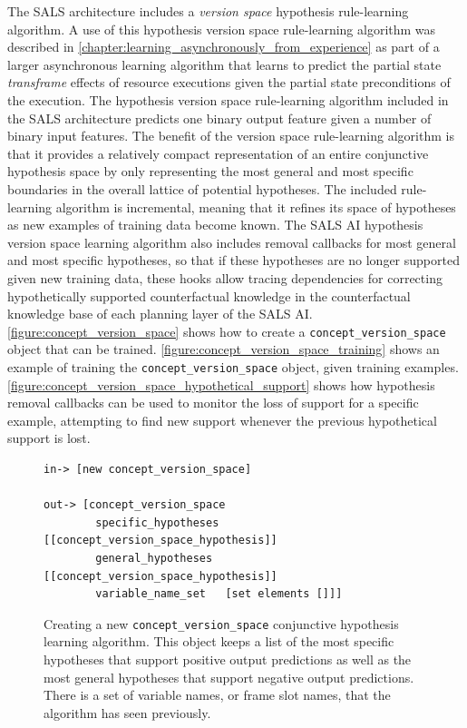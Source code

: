 The SALS architecture includes a {\emph{version space}}
\cite[]{mitchell:1997} hypothesis rule-learning algorithm.  A use of
this hypothesis version space rule-learning algorithm was described in
{\mbox{\autoref{chapter:learning_asynchronously_from_experience}}} as
part of a larger asynchronous learning algorithm that learns to
predict the partial state {\emph{transframe}} \cite[]{minsky:1975}
effects of resource executions given the partial state preconditions
of the execution.  The hypothesis version space rule-learning
algorithm included in the SALS architecture predicts one binary output
feature given a number of binary input features.  The benefit of the
version space rule-learning algorithm is that it provides a relatively
compact representation of an entire conjunctive hypothesis space by
only representing the most general and most specific boundaries in the
overall lattice of potential hypotheses.  The included rule-learning
algorithm is incremental, meaning that it refines its space of
hypotheses as new examples of training data become known.  The SALS AI
hypothesis version space learning algorithm also includes removal
callbacks for most general and most specific hypotheses, so that if
these hypotheses are no longer supported given new training data,
these hooks allow tracing dependencies for correcting hypothetically
supported counterfactual knowledge in the counterfactual knowledge
base of each planning layer of the SALS AI.
{\mbox{\autoref{figure:concept_version_space}}} shows how to create a
{\tt{concept\_version\_space}} object that can be trained.
{\mbox{\autoref{figure:concept_version_space_training}}} shows an
example of training the {\tt{concept\_version\_space}} object, given
training examples.
{\mbox{\autoref{figure:concept_version_space_hypothetical_support}}}
shows how hypothesis removal callbacks can be used to monitor the loss
of support for a specific example, attempting to find new support
whenever the previous hypothetical support is lost.
\begin{figure}[h]
\centering
{\scriptsize
\begin{Verbatim}[frame=single]
 in-> [new concept_version_space]

out-> [concept_version_space
        specific_hypotheses [[concept_version_space_hypothesis]]
        general_hypotheses  [[concept_version_space_hypothesis]]
        variable_name_set   [set elements []]]
\end{Verbatim}
}
\caption[Creating a new {\tt{concept\_version\_space}} conjunctive
  hypothesis learning algorithm.]{Creating a new
  {\tt{concept\_version\_space}} conjunctive hypothesis learning
  algorithm.  This object keeps a list of the most specific hypotheses
  that support positive output predictions as well as the most general
  hypotheses that support negative output predictions.  There is a set
  of variable names, or frame slot names, that the algorithm has seen
  previously.}
\label{figure:concept_version_space}
\end{figure}
